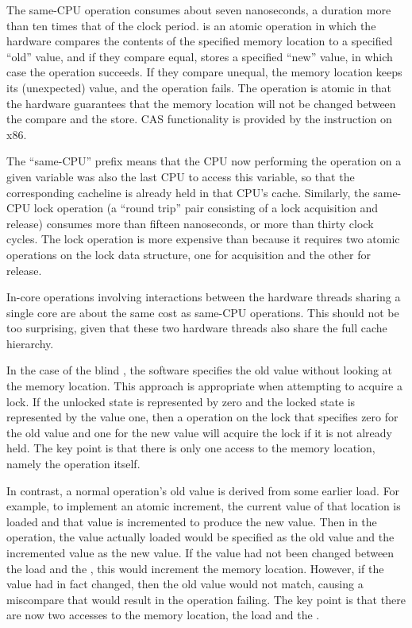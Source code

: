 The same-CPU  operation consumes about seven
nanoseconds, a duration more than ten times that of the clock period.
 is an atomic operation in which the hardware compares the contents
of the specified memory location to a specified ``old'' value, and if
they compare equal, stores a specified ``new'' value, in which case the
 operation succeeds.
If they compare unequal, the memory location keeps its (unexpected) value,
and the  operation fails.
The operation is atomic in that the hardware guarantees that the memory
location will not be changed between the compare and the store.
CAS functionality is provided by the  instruction on x86.

The ``same-CPU'' prefix means that the CPU now performing the  operation
on a given variable was also the last CPU to access this variable, so
that the corresponding cacheline is already held in that CPU's cache.
Similarly, the same-CPU lock operation (a ``round trip'' pair consisting
of a lock acquisition and release) consumes more than fifteen nanoseconds,
or more than thirty clock cycles.
The lock operation is more expensive than  because it requires two
atomic operations on the lock data structure, one for acquisition and
the other for release.

In-core operations involving interactions between the hardware threads
sharing a single core are about the same cost as same-CPU operations.
This should not be too surprising, given that these two hardware threads
also share the full cache hierarchy.

In the case of the blind , the software specifies the old value
without looking at the memory location.
This approach is appropriate when attempting to acquire a lock.
If the unlocked state is represented by zero and the locked state
is represented by the value one, then a  operation on the lock
that specifies zero for the old value and one for the new value
will acquire the lock if it is not already held.
The key point is that there is only one access to the memory
location, namely the  operation itself.

In contrast, a normal  operation's old value is derived from
some earlier load.
For example, to implement an atomic increment, the current value of
that location is loaded and that value is incremented to produce the
new value.
Then in the  operation, the value actually loaded would be specified
as the old value and the incremented value as the new value.
If the value had not been changed between the load and the , this
would increment the memory location.
However, if the value had in fact changed, then the old value would
not match, causing a miscompare that would result in the  operation
failing.
The key point is that there are now two accesses to the memory location,
the load and the .

